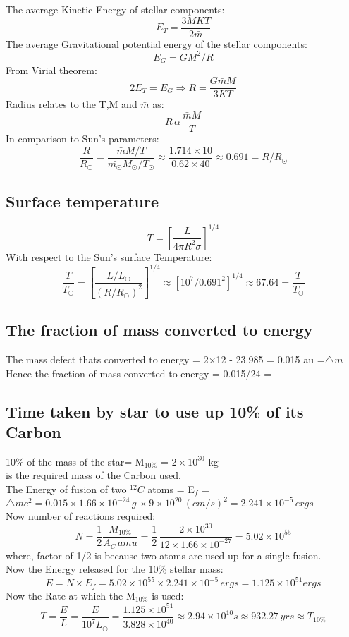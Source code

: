 \documentclass[11pt]{article}
\begin{document}
	The average Kinetic Energy of stellar components:
	\[
		E_T = \frac{3MKT}{2\bar{m}} 
	\]
	The average Gravitational potential energy of the stellar components:
	\[
		E_G = GM^2/R
	\]
	From Virial theorem:
	\[
		2E_T = E_G \Rightarrow R = \frac{G\bar{m}M}{3KT}
	\]
	Radius relates to the T,M and $\bar{m}$ as:
	\[
		\boxed{R \, \alpha \, \frac{\bar{m}M}{T}}
	\]
	In comparison to Sun's parameters:
	\[
		\frac{R}{R_\odot} = \frac{\bar{m}M/T}{\bar{m_\odot}M_\odot/T_\odot} \approx \frac{1.714 \times 10}{0.62 \times 40} \boxed{\approx 0.691 = R/R_\odot}
	\]
	\subsection{Surface temperature}
	\[
		T = [\frac{L}{4\pi R^2 \sigma}]^{1/4}
	\]
	With respect to the Sun's surface Temperature:
	\[
		\frac{T}{T_\odot} = [\frac{L/L_\odot}{(R/R_\odot)^2}]^{1/4} \approx [10^7/0.691^2]^{1/4} \boxed{\approx 67.64 = \frac{T}{T_\odot}}
	\]
	\subsection{The fraction of mass converted to energy}
	
	The mass defect thats converted to energy = 2$\times$12 - 23.985 = 0.015 au =$\triangle m$\\
	Hence the fraction of mass converted to energy = 0.015/24 = 
	
	\subsection{Time taken by star to use up 10\% of its Carbon}
	
	10\% of the mass of the star= M$_{10\%}$ = \(2\times 10^{30}\) kg\\
	is the required mass of the Carbon used.\\
	The Energy of fusion of two $^12C$ atoms = E$_f$ = \( \triangle m c^2 = 0.015 \times 1.66 \times 10^{-24} \, g\, \times 9 \times 10^{20} \, (cm/s)^2 = 2.241 \times 10^{-5} \, ergs \)\\
	Now number of reactions required:
	\[
		N = \frac{1}{2} \frac{M_{10\%}}{A_C \, amu} = \frac{1}{2}\, \frac{2\times10^{30}}{12 \times 1.66\times 10^{-27}} = 5.02 \times 10^{55}
	\]
	where, factor of 1/2 is because two atoms are used up for a single fusion.\\
	Now the Energy released for the 10\% stellar mass:
	\[
		E = N \times E_f = 5.02\times 10^{55} \times 2.241 \times 10^{-5} \,ergs  = 1.125 \times 10^{51} ergs
	\]
	Now the Rate at which the M$_{10\%}$ is used:
	\[
		T = \frac{E}{L} = \frac{E}{10^7 L_\odot} = \frac{1.125 \times 10^{51}}{3.828 \times 10^{40}} \approx 2.94 \times 10^{10} s \approx \boxed{932.27 \, yrs \approx T_{10\%}}
	\]
	
\end{document}

